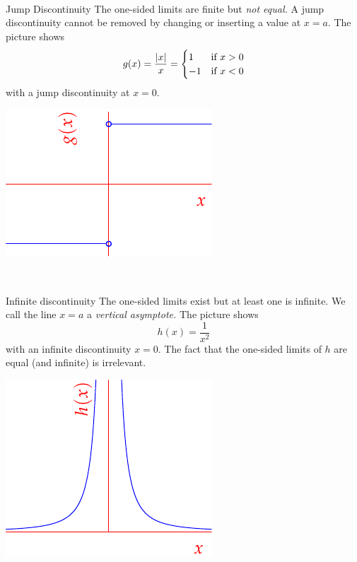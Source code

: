 \begin{description}
\begin{minipage}[t]{0.34\linewidth}
	\end{minipage}\\[5pt]
	\begin{minipage}[t]{0.65\linewidth}\vspace{0pt}
	\item[Jump Discontinuity] The one-sided limits are finite but \emph{not equal.} A jump discontinuity cannot be removed by changing or inserting a value at $x=a$. The picture shows
	\[g(x)=\frac{\left| x\right|}x=\begin{cases}
	1&\text{if }x>0\\
	-1&\text{if }x<0
	\end{cases}\]
	with a jump discontinuity at $x=0$.
	\end{minipage}
	\begin{minipage}[t]{0.34\linewidth}\vspace{0pt}
	\flushright\includegraphics{discont3}
	\end{minipage}\\[5pt]
	\begin{minipage}[t]{0.65\linewidth}\vspace{0pt}
	\item[Infinite discontinuity] The one-sided limits exist but at least one is infinite. We call the line $x=a$ a  \emph{vertical asymptote.} The picture shows
	\[h(x)=\frac 1{x^2}\]
	with an infinite discontinuity $x=0$. The fact that the one-sided limits of $h$ are equal (and infinite) is irrelevant.
	\end{minipage}
	\begin{minipage}[t]{0.34\linewidth}\vspace{0pt}
	\flushright\includegraphics{discont4}

\end{minipage}
\end{description}

